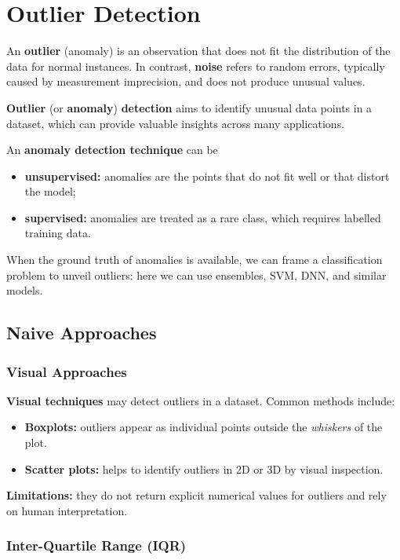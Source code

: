 \section{Outlier Detection}
An \textbf{outlier} (anomaly) is an observation that does not fit the distribution of the data for normal instances. In contrast, \textbf{noise} refers to random errors, typically caused by measurement imprecision, and does not produce unusual values.

\textbf{Outlier} (or \textbf{anomaly}) \textbf{detection} aims to identify unusual data points in a dataset, which can provide valuable insights across many applications.

An \textbf{anomaly detection technique} can be
\begin{itemize}
    \item \textbf{unsupervised:} anomalies are the points that do not fit well or that distort the model;
    \item \textbf{supervised:} anomalies are treated as a rare class, which requires labelled training data.
\end{itemize}
When the ground truth of anomalies is available, we can frame a classification problem to unveil outliers: here we can use ensembles, SVM, DNN, and similar models.
\subsection{Naive Approaches}
\subsubsection{Visual Approaches}

\textbf{Visual techniques} may detect outliers in a dataset. Common methods include:

\begin{itemize}
    \item \textbf{Boxplots:} outliers appear as individual points outside the \textit{whiskers} of the plot.
    \item \textbf{Scatter plots:} helps to identify outliers in 2D or 3D by visual inspection.
\end{itemize}

\textbf{Limitations:} they do not return explicit numerical values for outliers and rely on human interpretation.

\subsubsection{Inter-Quartile Range (IQR)}

